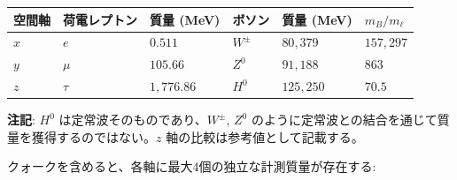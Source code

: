 \documentclass[
  a4paper,11pt]{ltjsarticle}
\newcounter{none} %
\begin{document}
{\def\LTcaptype{none} %
\begin{longtable}[]{@{}
  >{\centering\arraybackslash}p{}
  >{\centering\arraybackslash}p{}
  >{\raggedleft\arraybackslash}p{}
  >{\centering\arraybackslash}p{}
  >{\raggedleft\arraybackslash}p{}
  >{\raggedleft\arraybackslash}p{}@{}}
\toprule\noalign{}
\begin{minipage}[b]{\linewidth}\centering
空間軸
\end{minipage} & \begin{minipage}[b]{\linewidth}\centering
荷電レプトン
\end{minipage} & \begin{minipage}[b]{\linewidth}\raggedleft
質量 (MeV)
\end{minipage} & \begin{minipage}[b]{\linewidth}\centering
ボソン
\end{minipage} & \begin{minipage}[b]{\linewidth}\raggedleft
質量 (MeV)
\end{minipage} & \begin{minipage}[b]{\linewidth}\raggedleft
\(m_B / m_\ell\)
\end{minipage} \\
\midrule\noalign{}
\endhead
\bottomrule\noalign{}
\endlastfoot
\(x\) & \(e\) & \(0.511\) & \(W^{\pm}\) & \(80{,}379\) &
\(157{,}297\) \\
\(y\) & \(\mu\) & \(105.66\) & \(Z^0\) & \(91{,}188\) & \(863\) \\
\(z\) & \(\tau\) & \(1{,}776.86\) & \(H^0\) & \(125{,}250\) &
\(70.5\) \\
\end{longtable}
}

\textbf{注記}: \(H^0\) は定常波そのものであり、\(W^{\pm}\), \(Z^0\)
のように定常波との結合を通じて質量を獲得するのではない。\(z\)
軸の比較は参考値として記載する。

クォークを含めると、各軸に最大4個の独立な計測質量が存在する:
\end{document}
